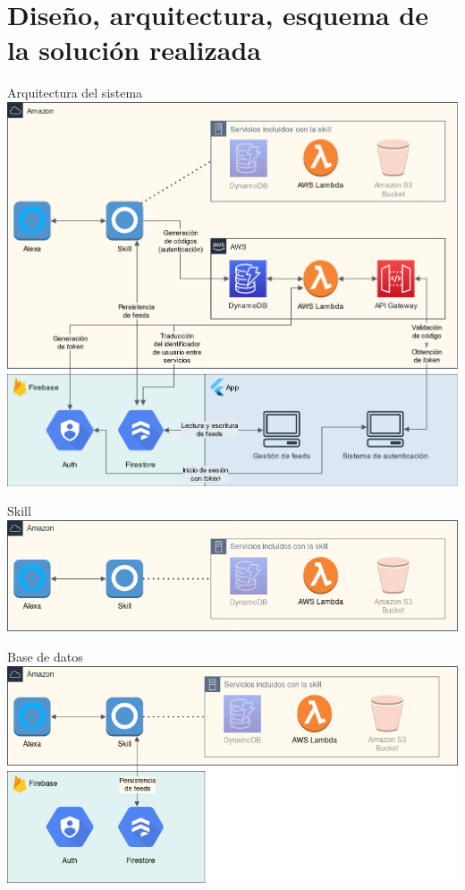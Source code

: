 \documentclass{beamer}
\begin{document}
  \section{Diseño, arquitectura, esquema de la solución realizada}

  \begin{frame}{Arquitectura del sistema}
    \includegraphics[width=.9\textwidth]{diagrama-bloques.png}  
  \end{frame}

  \begin{frame}{Skill}
    \includegraphics[width=\textwidth]{bloques-skill.png}  
  \end{frame}

  \begin{frame}{Base de datos}
    \includegraphics[width=\textwidth]{bloques-bd.png}  
  \end{frame}
\end{document}

